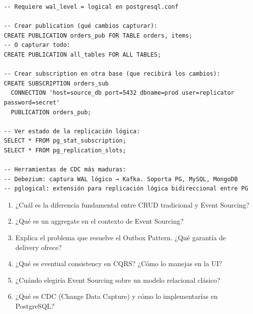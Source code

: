 \begin{lstlisting}[caption={Replicación lógica como CDC}]
-- Requiere wal_level = logical en postgresql.conf

-- Crear publication (qué cambios capturar):
CREATE PUBLICATION orders_pub FOR TABLE orders, items;
-- O capturar todo:
CREATE PUBLICATION all_tables FOR ALL TABLES;

-- Crear subscription en otra base (que recibirá los cambios):
CREATE SUBSCRIPTION orders_sub
  CONNECTION 'host=source_db port=5432 dbname=prod user=replicator password=secret'
  PUBLICATION orders_pub;

-- Ver estado de la replicación lógica:
SELECT * FROM pg_stat_subscription;
SELECT * FROM pg_replication_slots;

-- Herramientas de CDC más maduras:
-- Debezium: captura WAL lógico → Kafka. Soporta PG, MySQL, MongoDB
-- pglogical: extensión para replicación lógica bidireccional entre PG
\end{lstlisting}

\begin{entrevistabox}
\begin{enumerate}
  \item ¿Cuál es la diferencia fundamental entre CRUD tradicional y Event Sourcing?
  \item ¿Qué es un aggregate en el contexto de Event Sourcing?
  \item Explica el problema que resuelve el Outbox Pattern. ¿Qué garantía de delivery ofrece?
  \item ¿Qué es eventual consistency en CQRS? ¿Cómo lo manejas en la UI?
  \item ¿Cuándo elegiría Event Sourcing sobre un modelo relacional clásico?
  \item ¿Qué es CDC (Change Data Capture) y cómo lo implementarías en PostgreSQL?
\end{enumerate}
\end{entrevistabox}
